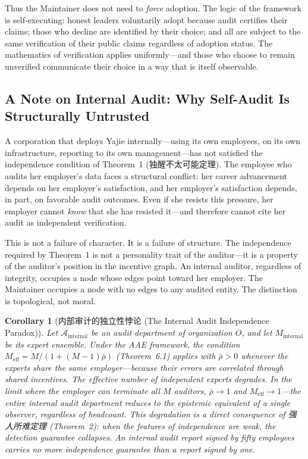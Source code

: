 \documentclass[12pt,a4paper]{ctexart}
\newtheorem{corollary}[theorem]{Corollary}
\theoremstyle{definition}
\theoremstyle{remark}
\begin{document}
Thus the Maintainer does not need to \textit{force} adoption. The logic of the framework is self-executing: honest leaders voluntarily adopt because audit certifies their claims; those who decline are identified by their choice; and all are subject to the same verification of their public claims regardless of adoption status. The mathematics of verification applies uniformly—and those who choose to remain unverified communicate their choice in a way that is itself observable.

\subsection{A Note on Internal Audit: Why Self-Audit Is Structurally Untrusted}

A corporation that deploys Yajie internally—using its own employees, on its own infrastructure, reporting to its own management—has not satisfied the independence condition of Theorem~1 (独醒不太可能定理). The employee who audits her employer's data faces a structural conflict: her career advancement depends on her employer's satisfaction, and her employer's satisfaction depends, in part, on favorable audit outcomes. Even if she resists this pressure, her employer cannot \textit{know} that she has resisted it—and therefore cannot cite her audit as independent verification.

This is not a failure of character. It is a failure of structure. The independence required by Theorem~1 is not a personality trait of the auditor—it is a property of the auditor's position in the incentive graph. An internal auditor, regardless of integrity, occupies a node whose edges point toward her employer. The Maintainer occupies a node with no edges to any audited entity. The distinction is topological, not moral.

\begin{corollary}[内部审计的独立性悖论 (The Internal Audit Independence Paradox)]
\label{cor:internal-audit-paradox}
Let $\mathcal{A}_{\text{internal}}$ be an audit department of organization $O$, and let $M_{\text{internal}}$ be its expert ensemble. Under the AAE framework, the condition $M_{\text{eff}} = M/(1+(M-1)\bar{\rho})$ (Theorem~6.1) applies with $\bar{\rho} > 0$ whenever the experts share the same employer—because their errors are correlated through shared incentives. The effective number of independent experts degrades. In the limit where the employer can terminate all $M$ auditors, $\bar{\rho} \to 1$ and $M_{\text{eff}} \to 1$—the entire internal audit department reduces to the epistemic equivalent of a single observer, regardless of headcount. This degradation is a direct consequence of 强人所难定理 (Theorem~2): when the features of independence are weak, the detection guarantee collapses. An internal audit report signed by fifty employees carries no more independence guarantee than a report signed by one.
\end{corollary}
\end{document}
